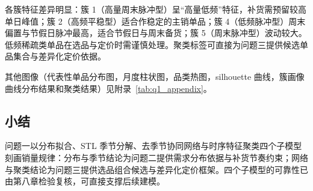 各簇特征差异明显：簇 1（高量周末脉冲型）呈“高量低频”特征，补货需预留较高单日峰值；簇 2（高频平稳型）适合作稳定的主销单品；簇 4（低频脉冲型）周末偏置与节假日脉冲最高，适合节假日与周末备货；簇 5（周末脉冲型）波动较大。低频稀疏类单品在选品与定价时需谨慎处理。聚类标签可直接为问题三提供候选单品集合与差异化定价依据。

其他图像（代表性单品分布图，月度柱状图，品类热图，silhouette 曲线，簇画像曲线分布结果和聚类结果）见附录~\ref{tab:q1_appendix}。
\subsection{小结}

问题一以分布拟合、STL 季节分解、去季节协同网络与时序特征聚类四个子模型刻画销量规律：分布与季节结论为问题二提供需求分布依据与补货节奏约束；网络与聚类结论为问题三提供选品组合候选与差异化定价框架。四个子模型的可靠性已由第八章检验复核，可直接支撑后续建模。